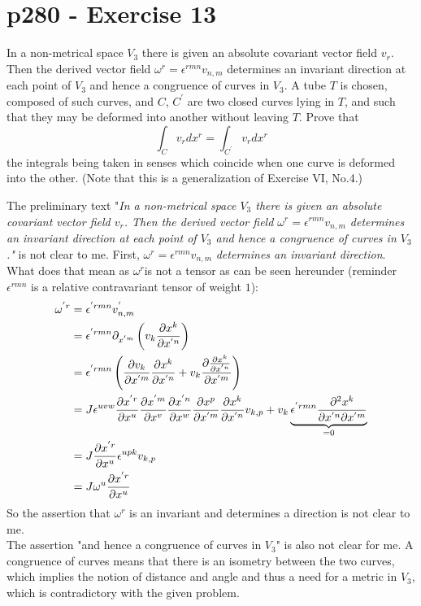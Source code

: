 \section{p280 - Exercise 13}
\begin{tcolorbox}
In a non-metrical space $V_3$ there is given an absolute covariant vector field $v_r$. Then the derived vector field $\omega^r =\epsilon^{rmn}v_{n,m}$ determines an invariant direction at each point of $V_3$ and hence a congruence of curves in $V_3$. A tube $T$ is chosen, composed of such curves, and $C$, $C^{'}$ are two closed curves lying in $T$, and such that they may be deformed into another without leaving $T$. Prove that
$$\int_{C} v_rdx^r = \int_{C^{'}} v_r dx^r$$
the integrals being taken in senses which coincide when one curve is deformed into the other. (Note that this is a generalization of Exercise VI, No.4.) 
\end{tcolorbox}
The preliminary text "\textit{In a non-metrical space $V_3$ there is given an absolute covariant vector field $v_r$. Then the derived vector field $\omega^r =\epsilon^{rmn}v_{n,m}$ determines an invariant direction at each point of $V_3$ and hence a congruence of curves in $V_3$."} is not clear to me.
First, $\omega^r =\epsilon^{rmn}v_{n,m}$ \textit{determines an invariant direction}. What does that mean as  $\omega^r$is not a tensor as can be seen hereunder (reminder $\epsilon^{rmn}$ is a relative contravariant tensor of weight $1$):
\begin{align}
\omega^{'r} &=\epsilon^{'rmn}v^{'}_{n,m}\\
&=\epsilon^{'rmn}\partial_{x^{'m}}\left(v_{k}\pdv{x^k}{x^{'n}}\right)\\
&=\epsilon^{'rmn}\left(\pdv{v_{k}}{x^{'m}}\pdv{x^k}{x^{'n}}+ v_{k}\pdv{\pdv{x^k}{x^{'n}}}{x^{'m}}\right)\\
&=J\epsilon^{uvw}\pdv{x^{'r}}{x^{u}}\pdv{x^{'m}}{x^{v}}\pdv{x^{'n}}{x^{w}}\pdv{x^{p}}{x^{'m}}\pdv{x^k}{x^{'n}}v_{k,p}+ v_{k}\underbrace{\epsilon^{'rmn}\pdv[2]{x^k}{x^{'n}}{x^{'m}}}_{=0}\\
&=J\pdv{x^{'r}}{x^{u}}\epsilon^{upk}v_{k,p}\\
&=J\omega^{u}\pdv{x^{'r}}{x^{u}}
\end{align}
So the assertion that $\omega^r$ is an invariant  and determines a direction is not clear to me.\\ 
The assertion "and hence a congruence of curves in $V_3$" is also not clear for me. A congruence of curves means that there is an isometry between the two curves, which implies the notion of distance and angle and thus a need for a metric in $V_3$, which is contradictory with the given problem.
